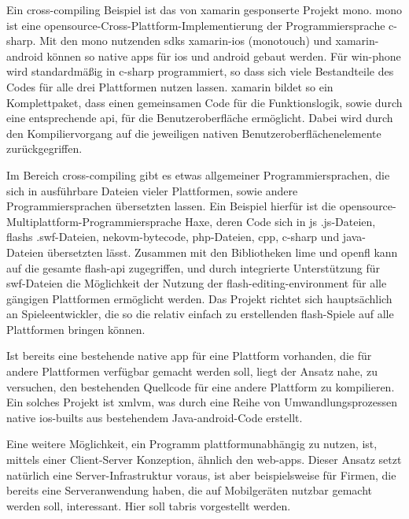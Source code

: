 Ein \gls{cross-compiling} Beispiel ist das von \gls{xamarin} gesponserte Projekt \gls{mono}. \gls{mono} ist eine \gls{opensource}-Cross-Plattform-Implementierung der Programmiersprache \gls{c-sharp}. Mit den \gls{mono} nutzenden \glspl{sdk} \gls{xamarin-ios} (\gls{monotouch}) und \gls{xamarin-android} können so native \glspl{app} für \gls{ios} und \gls{android} gebaut werden. Für \gls{win-phone} wird standardmäßig in \gls{c-sharp} programmiert, so dass sich viele Bestandteile des Codes für alle drei Plattformen nutzen lassen.
\gls{xamarin} bildet so ein Komplettpaket, dass einen gemeinsamen Code für die Funktionslogik, sowie durch eine entsprechende \gls{api}, für die Benutzeroberfläche ermöglicht. Dabei wird durch den Kompiliervorgang auf die jeweiligen nativen Benutzeroberflächenelemente zurückgegriffen.

Im Bereich \gls{cross-compiling} gibt es etwas allgemeiner Programmiersprachen, die sich in ausführbare Dateien vieler Plattformen, sowie andere Programmiersprachen übersetzten lassen. Ein Beispiel hierfür ist die \gls{opensource}-Multiplattform-Programmiersprache Haxe, deren Code sich in \gls{js} .js-Dateien, \glspl{flash} .swf-Dateien, \gls{nekovm}-\gls{bytecode}, \gls{php}-Dateien, \gls{cpp}, \gls{c-sharp} und \gls{java}-Dateien übersetzten lässt. Zusammen mit den Bibliotheken \gls{lime} und \gls{openfl} kann auf die gesamte \gls{flash}-\gls{api} zugegriffen, und durch integrierte Unterstützung für \gls{swf}-Dateien die Möglichkeit der Nutzung der \gls{flash-editing-environment} für alle gängigen Plattformen ermöglicht werden. Das Projekt richtet sich hauptsächlich an Spieleentwickler, die so die relativ einfach zu erstellenden \gls{flash}-Spiele auf alle Plattformen bringen können.

Ist bereits eine bestehende native \gls{app} für eine Plattform vorhanden, die für andere Plattformen verfügbar gemacht werden soll, liegt der Ansatz nahe, zu versuchen, den bestehenden Quellcode für eine andere Plattform zu kompilieren. Ein solches Projekt ist \gls{xmlvm}, was durch eine Reihe von Umwandlungsprozessen native \gls{ios}-\glspl{built} aus bestehendem Java-\gls{android}-Code erstellt.

Eine weitere Möglichkeit, ein Programm plattformunabhängig zu nutzen, ist, mittels einer Client-Server Konzeption, ähnlich den \glspl{web-app}. Dieser Ansatz setzt natürlich eine Server-Infrastruktur voraus, ist aber beispielsweise für Firmen, die bereits eine Serveranwendung haben, die auf Mobilgeräten nutzbar gemacht werden soll, interessant.
Hier soll \gls{tabris} vorgestellt werden.

